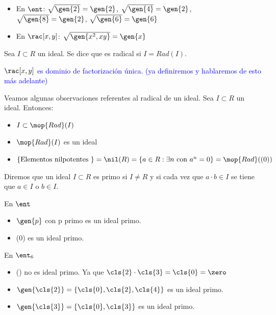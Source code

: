 \begin{example}
\begin{itemize}
	\item En $\ent$: $\sqrt{\gen{2}}=\gen{2}$, $\sqrt{\gen{4}}=\gen{2}$, $\sqrt{\gen{8}}=\gen{2}$, $\sqrt{\gen{6}}=\gen{6}$
	\item En $\rac[x,y]$: $\sqrt{\gen{x^2,xy}}=\gen{x}$
\end{itemize}
\end{example}

\begin{defn}
	Sea $I\subset R$ un ideal. Se dice que es radical si $I=Rad(I)$.
\end{defn}

\textcolor{blue}{\obs $\rac[x,y]$ es dominio de factorización única. (ya definiremos y hablaremos de esto más adelante)}

Veamos algunas observaciones referentes al radical de un ideal. Sea $I \subset R$ un ideal. Entonces:
\begin{itemize}
	\item $I \subset \mop{Rad}(I)$
	\item $\mop{Rad}(I)$ es un ideal
	\item $\{\text{Elementos nilpotentes }\}=\nil(R)=\{a\in R: \exists n \text{ con }a^n=0 \}=\mop{Rad}((0))$
\end{itemize}

\begin{defn} \label{def:IdealPrimo}
	Diremos que un ideal $I\subset R$ es primo si $I\neq R$ y si cada vez que $a\cdot b \in I$ se tiene que $a\in I$ o $b\in I$.
\end{defn}

\begin{example} En $\ent$
	\begin{itemize}
		\item $\gen{p}$ con p primo es un ideal primo.
		\item (0) es un ideal primo.
	\end{itemize}
\end{example}

\begin{example} En $\ent_6$
	\begin{itemize}
		\item (\zero) no es ideal primo. Ya que $\cls{2} \cdot \cls{3}=\cls{0}=\zero$
		\item $\gen{\cls{2}}=\{\cls{0},\cls{2},\cls{4} \}$ es un ideal primo.
		\item $\gen{\cls{3}}=\{\cls{0},\cls{3} \}$ es un ideal primo.
	\end{itemize}
\end{example}

